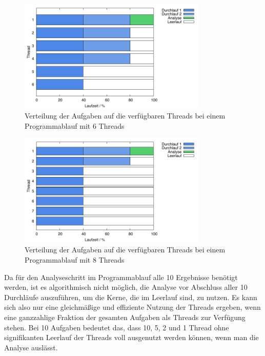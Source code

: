 \begin{figure}[H]
  \centering
  \includegraphics[width=0.8\textwidth]{../results/plots/timeline/timeline_plot_6threads.pdf}
  \caption{Verteilung der Aufgaben auf die verfügbaren Threads bei einem Programmablauf mit 6 Threads}
  \label{fig:runtime_timeline_6threads}
\end{figure}

\begin{figure}[H]
  \centering
  \includegraphics[width=0.8\textwidth]{../results/plots/timeline/timeline_plot_8threads.pdf}
  \caption{Verteilung der Aufgaben auf die verfügbaren Threads bei einem Programmablauf mit 8 Threads}
  \label{fig:runtime_timeline_8threads}
\end{figure}

Da für den Analyseschritt im Programmablauf alle 10 Ergebnisse benötigt werden, ist es algorithmisch nicht möglich, die Analyse vor Abschluss aller 10 Durchläufe auszuführen, um die Kerne, die im Leerlauf sind, zu nutzen. Es kann sich also nur eine gleichmäßige und effiziente Nutzung der Threads ergeben, wenn eine ganzzahlige Fraktion der gesamten Aufgaben als Threads zur Verfügung stehen. Bei 10 Aufgaben bedeutet das, dass 10, 5, 2 und 1 Thread ohne signifikanten Leerlauf der Threads voll ausgenutzt werden können, wenn man die Analyse auslässt.

